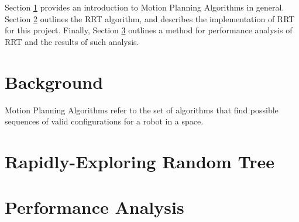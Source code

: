 
Section \ref{section:motion_planning_background} provides an introduction to Motion Planning Algorithms in general. Section \ref{section:rrt} outlines the \ac{RRT} algorithm, and describes the implementation of \ac{RRT} for this project. Finally, Section \ref{section:rrt_analysis} outlines a method for performance analysis of \ac{RRT} and the results of such analysis.

\section{Background} 
\label{section:motion_planning_background}
    Motion Planning Algorithms refer to the set of algorithms that find possible sequences of valid configurations for a robot in a space.
    \newline
    \newline

\newpage
\section{Rapidly-Exploring Random Tree}
\label{section:rrt}
    

\section{Performance Analysis}
\label{section:rrt_analysis}
    